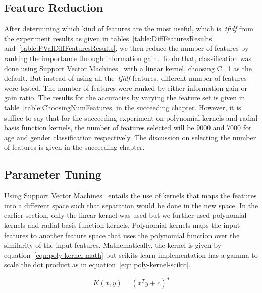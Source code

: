 \documentclass[a4paper]{llncs}
\begin{document}
\subsection{Feature Reduction}
After determining which kind of features are the most useful, which is~\textit{tfidf} from the experiment results as given in tables~\ref{table:DiffFeaturesResults} and~\ref{table:PValDiffFeaturesResults}, we then reduce the number of features by ranking the importance through information gain. To do that, classification was done using Support Vector Machines~\cite{cortes1995support} with a linear kernel, choosing C=1 as the default. But instead of using all the~\textit{tfidf} features, different number of features were tested. The number of features were ranked by either information gain or gain ratio. The results for the accuracies by varying the feature set is given in table~\ref{table:ChoosingNumFeatures} in the succeeding chapter. However, it is suffice to say that for the succeeding experiment on polynomial kernels and radial basis function kernels, the number of features selected will be 9000 and 7000 for age and gender classification respectively. The discussion on selecting the number of features is given in the succeeding chapter. 




\subsection{Parameter Tuning}
Using Support Vector Machines~\cite{cortes1995support} entails the use of kernels that maps the features into a different space such that separation would be done in the new space. In the earlier section, only the linear kernel was used but we further used polynomial kernels and radial basis function kernels. Polynomial kernels maps the input features to another feature space that uses the polynomial function over the similarity of the input features. Mathematically, the kernel is given by equation~\ref{eqn:poly-kernel-math} but scikits-learn implementation has a gamma to scale the dot product as in equation~\ref{eqn:poly-kernel-scikit}.

\begin{equation}
K(x,y) = (x^Ty + c)^d
\label{eqn:poly-kernel-math}
\end{equation}
\end{document}
